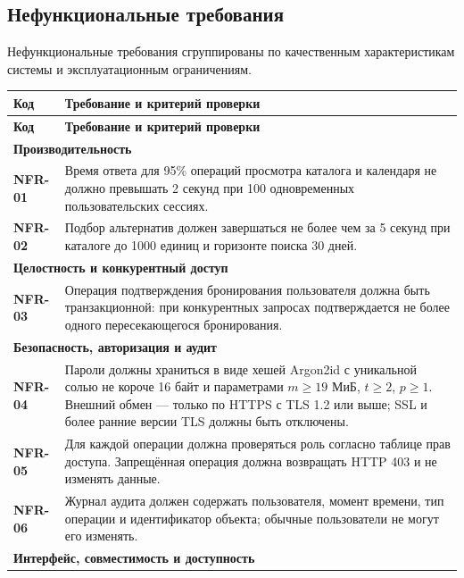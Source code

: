 \documentclass[12pt,a4paper]{article}
\renewcommand{\arraystretch}{1.25}
\newcommand{\req}[1]{\textbf{#1}}
\begin{document}
\subsection{Нефункциональные требования}

Нефункциональные требования сгруппированы по качественным характеристикам системы
и эксплуатационным ограничениям.

\begingroup
\small
{}
\renewcommand{\arraystretch}{1.05}
\begin{longtable}{|p{}|p{}|}
\hline
\textbf{Код} & \textbf{Требование и критерий проверки} \\
\hline
\endfirsthead
\hline
\textbf{Код} & \textbf{Требование и критерий проверки} \\
\hline
\endhead
\multicolumn{2}{|l|}{\textbf{Производительность}} \\
\hline
\req{NFR-01} & Время ответа для 95\% операций просмотра каталога и календаря
не должно превышать 2 секунд при 100 одновременных пользовательских сессиях. \\
\hline
\req{NFR-02} & Подбор альтернатив должен завершаться не более чем за 5 секунд
при каталоге до 1000 единиц и горизонте поиска 30 дней. \\
\hline
\multicolumn{2}{|l|}{\textbf{Целостность и конкурентный доступ}} \\
\hline
\req{NFR-03} & Операция подтверждения бронирования пользователя должна быть транзакционной:
при конкурентных запросах подтверждается не более одного пересекающегося
бронирования. \\
\hline
\multicolumn{2}{|l|}{\textbf{Безопасность, авторизация и аудит}} \\
\hline
\req{NFR-04} & Пароли должны храниться в виде хешей Argon2id с уникальной солью
не короче 16 байт и параметрами $m \geq 19$ МиБ, $t \geq 2$, $p \geq 1$.
Внешний обмен --- только по HTTPS с TLS 1.2 или выше; SSL и более ранние версии
TLS должны быть отключены. \\
\hline
\req{NFR-05} & Для каждой операции должна проверяться роль согласно таблице
прав доступа. Запрещённая операция должна возвращать HTTP 403 и не изменять
данные. \\
\hline
\req{NFR-06} & Журнал аудита должен содержать пользователя, момент времени,
тип операции и идентификатор объекта; обычные пользователи не могут его
изменять. \\
\hline
\multicolumn{2}{|l|}{\textbf{Интерфейс, совместимость и доступность}} \\

\end{longtable}
\end{document}
